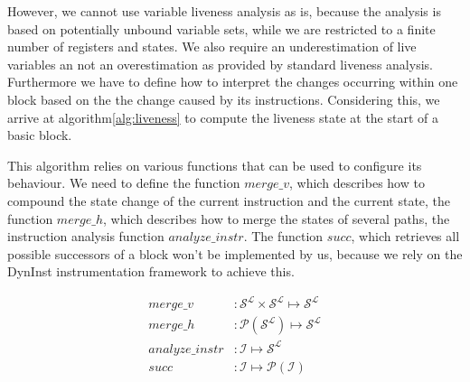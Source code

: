 However, we cannot use variable liveness analysis as is, because the analysis is based on potentially unbound variable sets, while we are restricted to a finite number of registers and states. We also require an underestimation of live variables an not an overestimation as provided by standard liveness analysis. Furthermore we have to define how to interpret the changes occurring within one block based on the the change caused by its instructions. Considering this, we arrive at algorithm\ref{alg:liveness} to compute the liveness state at the start of a basic block.

This algorithm relies on various functions that can be used to configure its behaviour. We need to define the function $merge\_v$, which describes how to compound the state change of the current instruction and the current state, the function $merge\_h$, which describes how to merge the states of several paths, the instruction analysis function $analyze\_instr$. The function $succ$, which retrieves all possible successors of a block won't be implemented by us, because we rely on the DynInst instrumentation framework to achieve this.

\begin{subequations}
\label{eq:livenesscustom}
\begin{align}
merge\_v &: \mathcal{S}^\mathcal{L} \times \mathcal{S}^\mathcal{L} \mapsto \mathcal{S}^\mathcal{L}\\
merge\_h &: \mathcal{P}(\mathcal{S}^\mathcal{L}) \mapsto \mathcal{S}^\mathcal{L}\\
analyze\_instr &: \mathcal {I} \mapsto \mathcal{S}^\mathcal{L} \\
succ &: \mathcal{I} \mapsto \mathcal{P}(\mathcal{I})
\end{align}
\end{subequations}

